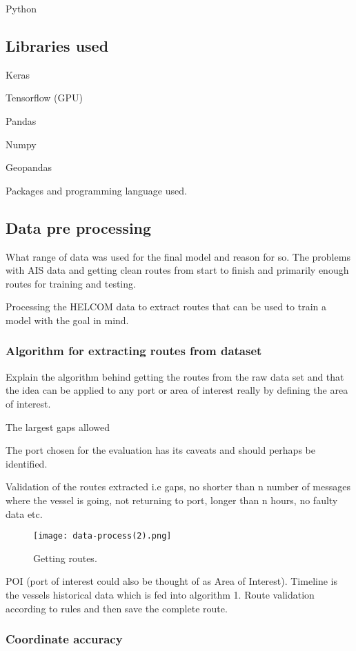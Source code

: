 \documentclass[../main.tex]{subfiles}
\begin{document}
Python
\subsection{Libraries used}

Keras

Tensorflow (GPU)

Pandas

Numpy

Geopandas

Packages and programming language used.


\subsection{Data pre processing}

What range of data was used for the final model and reason for so. The problems with AIS data and getting clean routes from start to finish and primarily enough routes for training and testing. 

Processing the HELCOM data to extract routes that can be used to train a model with the goal in mind.


\subsubsection{Algorithm for extracting routes from dataset}

Explain the algorithm behind getting the routes from the raw data set and that the idea can be applied to any port or area of interest really by defining the area of interest.

The largest gaps allowed

The port chosen for the evaluation has its caveats and should perhaps be identified.

Validation of the routes extracted i.e gaps, no shorter than n number of messages where the vessel is going, not returning to port, longer than n hours, no faulty data etc.

\begin{figure}[H]
	\centering
	\texttt{[image: data-process(2).png]}
	\caption{Getting routes.}
	\label{fig:flowchart}
\end{figure}

POI (port of interest could also be thought of as Area of Interest). Timeline is the vessels historical data which is fed into algorithm 1. Route validation according to rules and then save the complete route.

\subsubsection{Coordinate accuracy}
\end{document}
